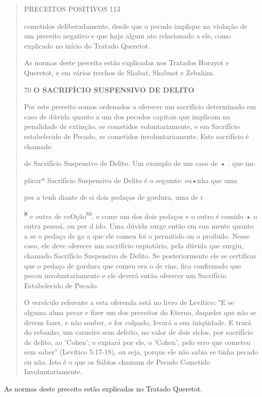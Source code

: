 \begin{quote}
PRECEITOS POSITIVOS 113

cometidos deliberadamente, desde que o pecado implique na violação de um
preceito negativo e que haja algum ato relacionado a ele, como explicado
no início do Tratado Queretot.

As normas deste preceito estão explicadas nos Tratados Horayot e
Queretot, e em vários trechos de Shabat, Shabuot e Zebahim.

70 \textbf{O SACRIFÍCIO SUSPENSIVO DE DELITO}

Por este preceito somos ordenados a oferecer um sacrifício determi­nado
em caso de dúvida quanto a um dos pecados capitais que implicam na
penalidade de extinção, se cometidos voluntariamente, e em Sacrifício
estabe­lecido de Pecado, se cometidos involuntariamente. Este sacrifício
é chamado

de Sacrifício Suspensivo de Delito. Um exemplo de um caso de • . que im-

plicar* Sacrifício Suspensivo de Delito é o seguinte: su•nha que uma

pes a tenh diante de si dois pedaços de gordura, uma de r

\textbf{\textsuperscript{8}} e outra de coOção\textsuperscript{89}. e
come um dos dois pedaços e o outro é comido • o outra pes­soá, ou per d
ido. Uma dúvida surge então em sua mente quanto a se o pedaço de go a
que ele comeu foi o permitido ou o proibido. Nesse caso, ele deve
oferecer um sacrifício expiatório, pela dúvida que surgiu, chamado
Sacrifício Suspensivo de Delito. Se posteriormente ele se certificar que
o pedaço de gor­dura que comeu era o de rins, fica confirmado que pecou
involuntariamente e ele deverá então oferecer um Sacrifício Estabelecido
de Pecado.

O versículo referente a esta oferenda está no livro de Levítico: "E se
alguma alma pecar e fizer um dos preceitos do Eterno, daqueles que não
se devem fazer, e não souber, e for culpado, levará a sua iniqüidade. E
trará do rebanho, um carneiro sem defeito, no valor de dois siclos, por
sacrifício de de­lito, ao 'Cohen'; e expiará por ele, o 'Cohen', pelo
erro que cometeu sem sa­ber" (Levítico 5:17-18), ou seja, porque ele não
sabia se tinha pecado ou não. Isto é o que os Sábios chamam de Pecado
Cometido Involuntariamente.
\end{quote}

As normas deste preceito estão explicadas no Tratado Queretot.


